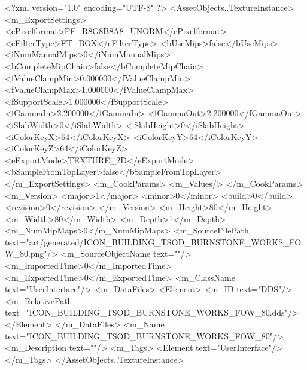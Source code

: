 <?xml version="1.0" encoding="UTF-8" ?>
<AssetObjects..TextureInstance>
	<m_ExportSettings>
		<ePixelformat>PF_R8G8B8A8_UNORM</ePixelformat>
		<eFilterType>FT_BOX</eFilterType>
		<bUseMips>false</bUseMips>
		<iNumManualMips>0</iNumManualMips>
		<bCompleteMipChain>false</bCompleteMipChain>
		<fValueClampMin>0.000000</fValueClampMin>
		<fValueClampMax>1.000000</fValueClampMax>
		<fSupportScale>1.000000</fSupportScale>
		<fGammaIn>2.200000</fGammaIn>
		<fGammaOut>2.200000</fGammaOut>
		<iSlabWidth>0</iSlabWidth>
		<iSlabHeight>0</iSlabHeight>
		<iColorKeyX>64</iColorKeyX>
		<iColorKeyY>64</iColorKeyY>
		<iColorKeyZ>64</iColorKeyZ>
		<eExportMode>TEXTURE_2D</eExportMode>
		<bSampleFromTopLayer>false</bSampleFromTopLayer>
	</m_ExportSettings>
	<m_CookParams>
		<m_Values/>
	</m_CookParams>
	<m_Version>
		<major>1</major>
		<minor>0</minor>
		<build>0</build>
		<revision>0</revision>
	</m_Version>
	<m_Height>80</m_Height>
	<m_Width>80</m_Width>
	<m_Depth>1</m_Depth>
	<m_NumMipMaps>0</m_NumMipMaps>
	<m_SourceFilePath text="art/generated/ICON_BUILDING_TSOD_BURNSTONE_WORKS_FOW_80.png"/>
	<m_SourceObjectName text=""/>
	<m_ImportedTime>0</m_ImportedTime>
	<m_ExportedTime>0</m_ExportedTime>
	<m_ClassName text="UserInterface"/>
	<m_DataFiles>
		<Element>
			<m_ID text="DDS"/>
			<m_RelativePath text="ICON_BUILDING_TSOD_BURNSTONE_WORKS_FOW_80.dds"/>
		</Element>
	</m_DataFiles>
	<m_Name text="ICON_BUILDING_TSOD_BURNSTONE_WORKS_FOW_80"/>
	<m_Description text=""/>
	<m_Tags>
		<Element text="UserInterface"/>
	</m_Tags>
</AssetObjects..TextureInstance>
